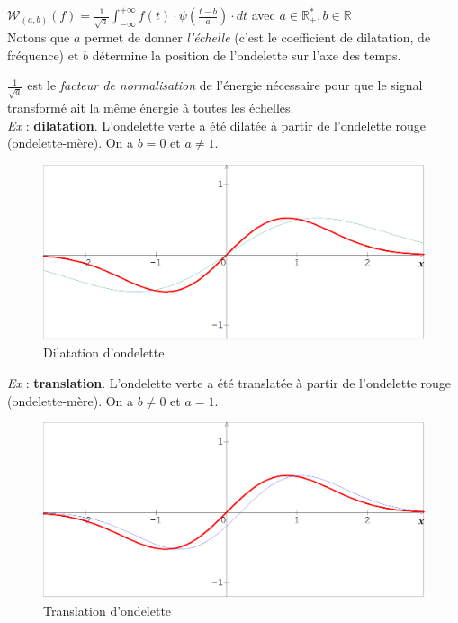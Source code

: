 \documentclass{article}
\begin{document}
$\displaystyle \mathcal{W}_{(a,b)}(f)= \frac{1}{\sqrt{a}}\int_{-\infty}^{+\infty}f(t)\cdot\psi(\frac{t - b}{a})\cdot dt $ avec $a \in \mathbb{R}_{+}^{*}, b \in \mathbb{R}$ \\

Notons que $a$ permet de donner \textit{l’échelle} (c’est le coefficient de dilatation, de fréquence) et $b$ détermine la position de l’ondelette sur l’axe des temps.

$\frac{1}{\sqrt{a}}$ est le \textit{facteur de normalisation} de l'énergie nécessaire pour que le signal transformé ait la même énergie à toutes les échelles. \\

\textit{Ex} : \textbf{dilatation}.
L’ondelette verte a été dilatée à partir de l’ondelette rouge (ondelette-mère). On a $b = 0$ et $a \neq 1$. \\

\begin{figure}[!h]
\centering
\includegraphics[scale=0.22]{images/dilatation.png}
\caption{Dilatation d'ondelette}
\label{dilat}
\end{figure}

\textit{Ex} : \textbf{translation}.
L’ondelette verte a été translatée à partir de l’ondelette rouge (ondelette-mère). On a $b \neq 0$ et $a = 1$.

\begin{figure}[!h]
\centering
\includegraphics[scale=0.22]{images/translation.png}
\caption{Translation d'ondelette}
\label{translat}
\end{figure}
\end{document}
